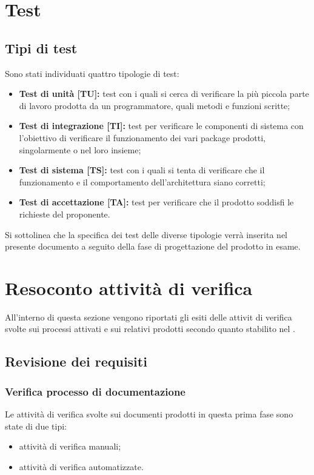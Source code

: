 \section{Test}
	\subsection{Tipi di test}
	Sono stati individuati quattro tipologie di test:
	\begin{itemize}
		\item \textbf{Test di unità [TU]:} test con i quali si cerca di verificare la più piccola parte di lavoro prodotta da un programmatore, quali metodi e funzioni scritte;
		\item \textbf{Test di integrazione [TI]:} test per verificare le componenti di sistema con l'obiettivo di verificare il funzionamento dei vari package prodotti, singolarmente o nel loro insieme;
		\item \textbf{Test di sistema [TS]:} test con i quali si tenta di verificare che il funzionamento e il comportamento dell'architettura siano corretti;
		\item \textbf{Test di accettazione [TA]:} test per verificare che il prodotto soddisfi le richieste del proponente.
	\end{itemize}
	Si sottolinea che la specifica dei test delle diverse tipologie verrà inserita nel presente documento a seguito della fase di progettazione del prodotto in esame.

\newpage
\section{Resoconto attività di verifica}
All'interno di questa sezione vengono riportati gli esiti delle attivit di verifica svolte sui processi attivati e sui relativi prodotti secondo quanto stabilito nel \PdP.
	\subsection{Revisione dei requisiti}
		\subsubsection{Verifica processo di documentazione}
		Le attività di verifica svolte sui documenti prodotti in questa prima fase sono state di due tipi:
		\begin{itemize}		
			\item attività di verifica manuali;
			\item attività di verifica automatizzate.
		\end{itemize}
		

